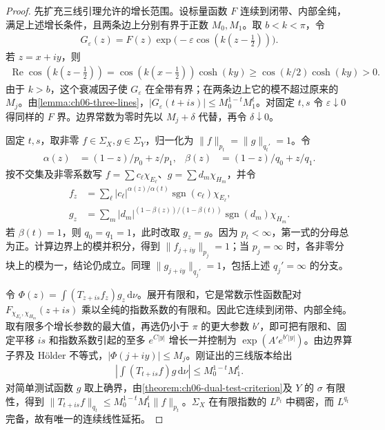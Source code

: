 \documentclass[../../main.tex]{subfiles}
\begin{document}
\begin{proof}
先扩充三线引理允许的增长范围。设标量函数 $F$ 连续到闭带、内部全纯，满足上述增长条件，且两条边上分别有界于正数 $M_0,M_1$。取 $b<k<\pi$，令
\begin{align*}
G_\varepsilon(z)=F(z)\exp\bigl(-\varepsilon\cos(k(z-\tfrac12))\bigr).
\end{align*}
若 $z=x+iy$，则
\begin{align*}
\operatorname{Re}\cos(k(z-\tfrac12))
=\cos(k(x-\tfrac12))\cosh(ky)
\geqslant\cos(k/2)\cosh(ky)>0.
\end{align*}
由于 $k>b$，这个衰减因子使 $G_\varepsilon$ 在全带有界；在两条边上它的模不超过原来的 $M_j$。由\cref{lemma:ch06-three-lines}，$|G_\varepsilon(t+is)|\leqslant M_0^{1-t}M_1^t$。对固定 $t,s$ 令 $\varepsilon\downarrow0$ 得同样的 $F$ 界。边界常数为零时先以 $M_j+\delta$ 代替，再令 $\delta\downarrow0$。

固定 $t,s$，取非零 $f\in\Sigma_X,g\in\Sigma_Y$，归一化为 $\|f\|_{p_t}=\|g\|_{q_t'}=1$。令
\begin{align*}
\alpha(z)&=(1-z)/p_0+z/p_1,&
\beta(z)&=(1-z)/q_0+z/q_1.
\end{align*}
按不交集及非零系数写 $f=\sum c_\ell\chi_{E_\ell}$、$g=\sum d_m\chi_{H_m}$，并令
\begin{align*}
f_z&=\sum_\ell |c_\ell|^{\alpha(z)/\alpha(t)}
\operatorname{sgn}(c_\ell)\chi_{E_\ell},\\
g_z&=\sum_m |d_m|^{(1-\beta(z))/(1-\beta(t))}
\operatorname{sgn}(d_m)\chi_{H_m}.
\end{align*}
若 $\beta(t)=1$，则 $q_0=q_1=1$，此时改取 $g_z=g$。因为 $p_t<\infty$，第一式的分母总为正。计算边界上的模并积分，得到 $\|f_{j+iy}\|_{p_j}=1$；当 $p_j=\infty$ 时，各非零分块上的模为一，结论仍成立。同理 $\|g_{j+iy}\|_{q_j'}=1$，包括上述 $q_j'=\infty$ 的分支。

令 $\Phi(z)=\int (T_{z+is}f_z)g_z\,\mathrm d\nu$。展开有限和，它是常数示性函数配对 $F_{\chi_{E_\ell},\chi_{H_m}}(z+is)$ 乘以全纯的指数系数的有限和。因此它连续到闭带、内部全纯。取有限多个增长参数的最大值，再选仍小于 $\pi$ 的更大参数 $b'$，即可把有限和、固定平移 $is$ 和指数系数引起的至多 $e^{C|y|}$ 增长一并控制为 $\exp(A'e^{b'|y|})$。由边界算子界及 Hölder 不等式，$|\Phi(j+iy)|\leqslant M_j$。刚证出的三线版本给出
\begin{align*}
\left|\int (T_{t+is}f)g\,\mathrm d\nu\right|
\leqslant M_0^{1-t}M_1^t.
\end{align*}
对简单测试函数 $g$ 取上确界，由\cref{theorem:ch06-dual-test-criterion}及 $Y$ 的 $\sigma$ 有限性，得到 $\|T_{t+is}f\|_{q_t}\leqslant M_0^{1-t}M_1^t\|f\|_{p_t}$。$\Sigma_X$ 在有限指数的 $L^{p_t}$ 中稠密，而 $L^{q_t}$ 完备，故有唯一的连续线性延拓。
\end{proof}
\end{document}
